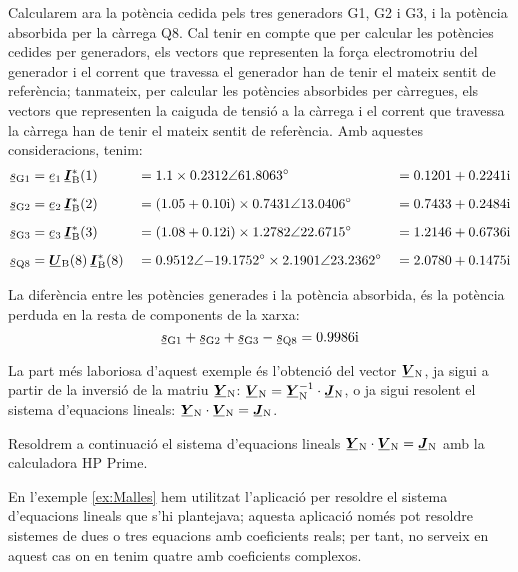 \begin{exemple}
    Calcularem ara la potència cedida pels tres generadors G1, G2 i G3, i la potència absorbida per la càrrega Q8. Cal tenir en compte que per calcular les potències cedides per generadors, els vectors que representen la força electromotriu del generador i el corrent que travessa el generador han de tenir el mateix sentit de referència; tanmateix, per calcular les potències absorbides per càrregues, els vectors que representen la caiguda de tensió a la càrrega i el corrent que travessa la càrrega han de tenir el mateix sentit de referència. Amb aquestes consideracions, tenim:
    \begin{alignat*}{3}
       \cmplx{s}\ped{G1} &= \cmplx{e}\ped{1} \, \mcmplx{I}\ped{B}^*(1) &&= \num{1,1} \times
        \complexnum{0,2312:61,8063} &&= \complexnum{0,1201 + j 0,2241} \\[2mm]
       \cmplx{s}\ped{G2} &= \cmplx{e}\ped{2} \, \mcmplx{I}\ped{B}^*(2) &&=
       (\complexnum{1,05 + j 0,10}) \times \complexnum{0,7431:13,0406} &&=
       \complexnum{0,7433 + j 0,2484} \\[2mm]
       \cmplx{s}\ped{G3} &= \cmplx{e}\ped{3} \, \mcmplx{I}\ped{B}^*(3) &&=
       (\complexnum{1,08 + j 0,12}) \times \complexnum{1,2782:22,6715} &&=
       \complexnum{1,2146 + j 0,6736}  \\[2mm]
       \cmplx{s}\ped{Q8} &= \mcmplx{U}\ped{B}(8) \, \mcmplx{I}\ped{B}^*(8) &&=
      \complexnum{0,9512:-19,1752} \times \complexnum{2,1901:23,2362}    &&=
      \complexnum{2,0780 + j 0,1475}
    \end{alignat*}

    La diferència entre les potències generades i la potència absorbida, és la potència perduda en la resta de components de la xarxa:
    \[
       \cmplx{s}\ped{G1} + \cmplx{s}\ped{G2} + \cmplx{s}\ped{G3} -
       \cmplx{s}\ped{Q8} = \complexnum{j 0,9986}
    \]

    La part més laboriosa d'aquest exemple és l'obtenció del vector $\mcmplx{V}\ped{N}$, ja sigui a partir de la inversió de la matriu $\mcmplx{Y}\ped{N}$: $\mcmplx{V}\ped{N} = \mcmplx{Y}\ped{N}^{-1} \cdot \mcmplx{J}\ped{N}$, o ja sigui  resolent el sistema d'equacions lineals: $\mcmplx{Y}\ped{N} \cdot \mcmplx{V}\ped{N} = \mcmplx{J}\ped{N}$.

    Resoldrem a continuació el sistema d'equacions lineals $\mcmplx{Y}\ped{N} \cdot \mcmplx{V}\ped{N} = \mcmplx{J}\ped{N}$ amb la calculadora \textsf{HP Prime}.

    En l'exemple \vref{ex:Malles} hem utilitzat l'aplicació  per resoldre el sistema d'equacions lineals que s'hi plantejava;  aquesta aplicació només pot resoldre sistemes de dues o tres equacions amb coeficients reals;  per tant, no serveix en aquest cas on en tenim quatre amb coeficients complexos.


\end{exemple}
